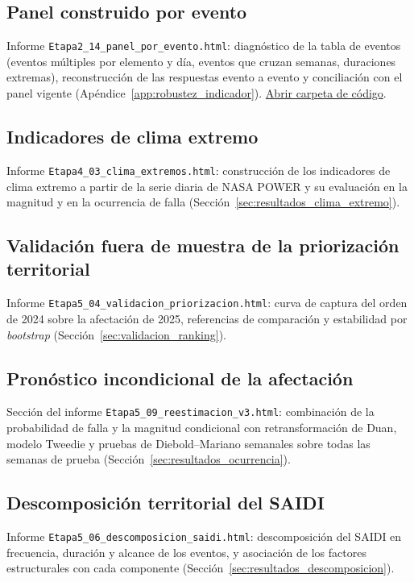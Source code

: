 \subsection{Panel construido por evento}
\label{app:html-etapa2-14}
Informe \texttt{Etapa2\_14\_panel\_por\_evento.html}: diagnóstico de la tabla de eventos (eventos múltiples por elemento y día, eventos que cruzan semanas, duraciones extremas), reconstrucción de las respuestas evento a evento y conciliación con el panel vigente (Apéndice~\ref{app:robustez_indicador}).
\href{\urlCodigoCierre}{Abrir carpeta de código}.

\subsection{Indicadores de clima extremo}
\label{app:html-etapa4-03}
Informe \texttt{Etapa4\_03\_clima\_extremos.html}: construcción de los indicadores de clima extremo a partir de la serie diaria de NASA POWER y su evaluación en la magnitud y en la ocurrencia de falla (Sección~\ref{sec:resultados_clima_extremo}).

\subsection{Validación fuera de muestra de la priorización territorial}
\label{app:html-etapa5-04}
Informe \texttt{Etapa5\_04\_validacion\_priorizacion.html}: curva de captura del orden de 2024 sobre la afectación de 2025, referencias de comparación y estabilidad por \emph{bootstrap} (Sección~\ref{sec:validacion_ranking}).

\subsection{Pronóstico incondicional de la afectación}
\label{app:html-etapa5-05}
Sección del informe \texttt{Etapa5\_09\_reestimacion\_v3.html}: combinación de la probabilidad de falla y la magnitud condicional con retransformación de Duan, modelo Tweedie y pruebas de Diebold--Mariano semanales sobre todas las semanas de prueba (Sección~\ref{sec:resultados_ocurrencia}).

\subsection{Descomposición territorial del SAIDI}
\label{app:html-etapa5-06}
Informe \texttt{Etapa5\_06\_descomposicion\_saidi.html}: descomposición del SAIDI en frecuencia, duración y alcance de los eventos, y asociación de los factores estructurales con cada componente (Sección~\ref{sec:resultados_descomposicion}).

